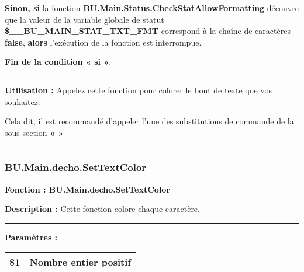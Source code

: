 \documentclass[a4paper,10pt]{article}
\begin{document}
\begin{justify}
    \textbf{\color{cond}Sinon, si} la fonction \textbf{\color{func}BU.Main.Status.CheckStatAllowFormatting} découvre que la valeur de la variable globale de statut \textbf{\color{vars}\$\_\_BU\_MAIN\_STAT\_TXT\_FMT} correspond à la chaîne de caractères \textbf{false}, \textbf{\color{cond}alors} l'exécution de la fonction est interrompue.
\end{justify}

\begin{justify}
    \textbf{\color{cond}Fin de la condition « si »}.
\end{justify}


\par\noindent\rule{\textwidth}{0.4pt}

\begin{justify}
    \textbf{Utilisation :} Appelez cette fonction pour colorer le bout de texte que vos souhaitez.
\end{justify}

\begin{justify}
    Cela dit, il est recommandé d'appeler l'une des substitutions de commande de la sous-section \textbf{\color{sec2}«  »}
\end{justify}






\color{sec3}\par\noindent\rule{\textwidth}{0.4pt}\color{text}

\color{sec3}
\subsubsection{BU.Main.decho.SetTextColor}\color{text}

\begin{justify}
    \textbf{Fonction : \color{func}BU.Main.decho.SetTextColor}
\end{justify}

\begin{justify}
    \textbf{Description :} Cette fonction colore chaque caractère.
\end{justify}


\par\noindent\rule{\textwidth}{0.4pt}

\begin{justify}
    \textbf{Paramètres :}

    \begin{tabular}{|l|l|}
        \hline
        \textbf{\color{orange}\$1} & Nombre entier positif\\
        \hline
    \end{tabular}
\end{justify}
\end{document}
